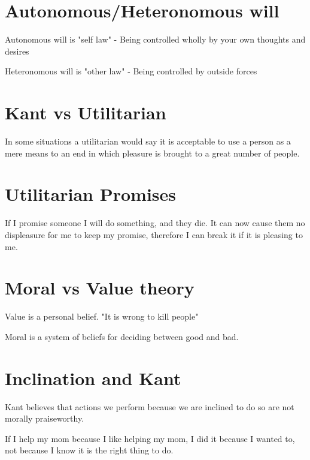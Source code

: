 \documentclass[11pt]{article}
\begin{document}
\section{Autonomous/Heteronomous will}
\label{sec-11}

Autonomous will is "self law" - Being controlled wholly by your own
thoughts and desires

Heteronomous will is "other law" - Being controlled by outside forces

\section{Kant vs Utilitarian}
\label{sec-12}

In some situations a utilitarian would say it is acceptable to use a
person as a mere means to an end in which pleasure is brought to a
great number of people.

\section{Utilitarian Promises}
\label{sec-13}

If I promise someone I will do something, and they die. It can now
cause them no displeasure for me to keep my promise, therefore I can
break it if it is pleasing to me.

\section{Moral vs Value theory}
\label{sec-14}

Value is a personal belief. "It is wrong to kill people"

Moral is a system of beliefs for deciding between good and bad.

\section{Inclination and Kant}
\label{sec-15}

Kant believes that actions we perform because we are inclined to do so
are not morally praiseworthy.

If I help my mom because I like helping my mom, I did it because I
wanted to, not because I know it is the right thing to do.
\end{document}
